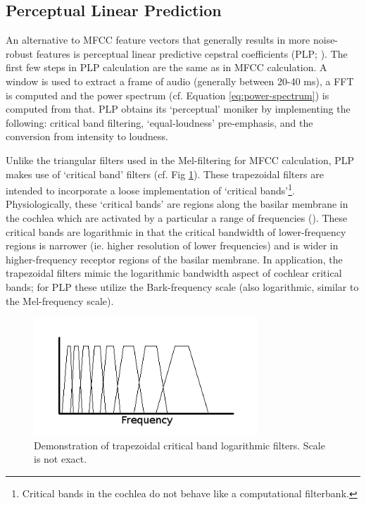 \subsection{Perceptual Linear Prediction}\label{sec:plp}

An alternative to MFCC feature vectors that generally results in more noise-robust features is perceptual linear predictive cepstral coefficients (PLP; \cite{hermansky:85}).  The first few steps in PLP calculation are the same as in MFCC calculation.  A window is used to extract a frame of audio (generally between 20-40 ms), a FFT is computed and the power spectrum (cf. Equation \ref{eq:power-spectrum}) is computed from that.  PLP obtains its `perceptual' moniker by implementing the following: critical band filtering, `equal-loudness' pre-emphasis, and the conversion from intensity to loudness.  

Unlike the triangular filters used in the Mel-filtering for MFCC calculation, PLP makes use of `critical band' filters (cf. Fig \ref{fig:filt-cb}).  These trapezoidal filters are intended to incorporate a loose implementation of `critical bands'\footnote{Critical bands in the cochlea do not behave like a computational filterbank.}. Physiologically, these `critical bands' are regions along the basilar membrane in the cochlea which are activated by a particular a range of frequencies (\cite{fletcher:40}).  These critical bands are logarithmic in that the critical bandwidth of lower-frequency regions is narrower (ie. higher resolution of lower frequencies) and is wider in higher-frequency receptor regions of the basilar membrane.  In application, the trapezoidal filters mimic the logarithmic bandwidth aspect of cochlear critical bands; for PLP these utilize the Bark-frequency scale (also logarithmic, similar to the Mel-frequency scale).

\begin{figure}[h]
\centering
\includegraphics[width=0.75\textwidth]{figure/filt-cb.png}
\caption{Demonstration of trapezoidal critical band logarithmic filters. Scale is not exact.}\label{fig:filt-cb}
\end{figure}

